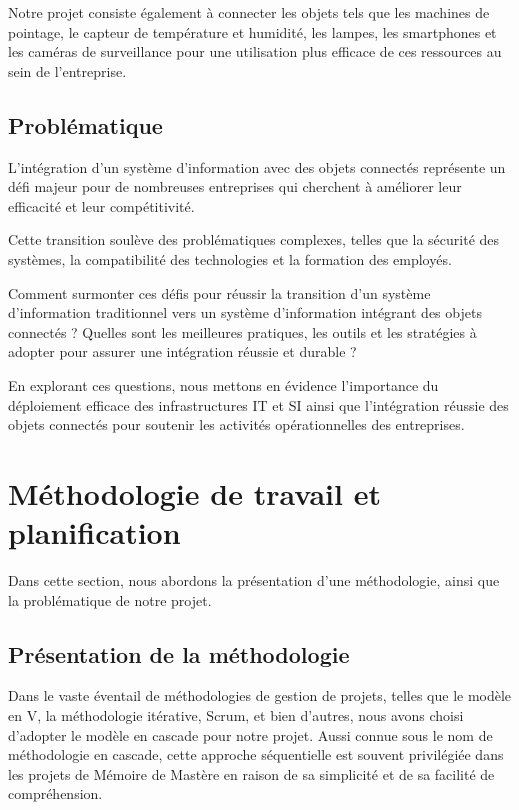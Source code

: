 Notre projet consiste également à connecter les objets tels que les machines de pointage, le capteur de température et humidité, les lampes, les smartphones et les caméras de surveillance pour une utilisation plus efficace de ces ressources au sein de l'entreprise.

\subsection{Problématique}
L'intégration d'un système d'information avec des objets connectés représente un défi majeur pour de nombreuses entreprises qui cherchent à améliorer leur efficacité et leur compétitivité.

Cette transition soulève des problématiques complexes, telles que la sécurité des systèmes, la compatibilité des technologies et la formation des employés.

Comment surmonter ces défis pour réussir la transition d'un système d'information traditionnel vers un système d'information intégrant des objets connectés ? Quelles sont les meilleures pratiques, les outils et les stratégies à adopter pour assurer une intégration réussie et durable ?

En explorant ces questions, nous mettons en évidence l'importance du déploiement efficace des infrastructures IT et SI ainsi que l'intégration réussie des objets connectés pour soutenir les activités opérationnelles des entreprises.



\section{Méthodologie de travail et planification}

Dans cette section, nous abordons la présentation d'une méthodologie, ainsi que la problématique de notre projet.


\subsection{Présentation de la méthodologie}

Dans le vaste éventail de méthodologies de gestion de projets, telles que le modèle en V, la méthodologie itérative, Scrum, et bien d'autres, nous avons choisi d'adopter le modèle en cascade pour notre projet. Aussi connue sous le nom de méthodologie en cascade, cette approche séquentielle est souvent privilégiée dans les projets de Mémoire de Mastère en raison de sa simplicité et de sa facilité de compréhension.

